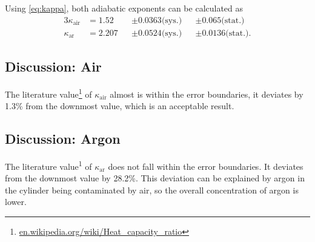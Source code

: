 Using \autoref{eq:kappa}, both adiabatic exponents can be calculated as
\begin{alignat*}{3}
	\kappa_\text{air}&=\num{1.52}&&\pm\num{0.0363}\text{(sys.)}&&\pm\num{0.065}\text{(stat.)} \\
	\kappa_\text{ar}&=\num{2.207}&&\pm\num{0.0524}\text{(sys.)}&&\pm\num{0.0136}\text{(stat.)}.
\end{alignat*}

\subsection{Discussion: Air}
The literature value\footnote{\url{en.wikipedia.org/wiki/Heat_capacity_ratio}} of $\kappa_\text{air}$ almost is within the error boundaries, it deviates by \num{1.3}\% from the downmost value, which is an acceptable result.

\subsection{Discussion: Argon}
The literature value\textsuperscript{1} of $\kappa_\text{ar}$ does not fall within the error boundaries.
It deviates from the downmost value by \num{28.2}\%.
This deviation can be explained by argon in the cylinder being contaminated by air, so the overall concentration of argon is lower.

